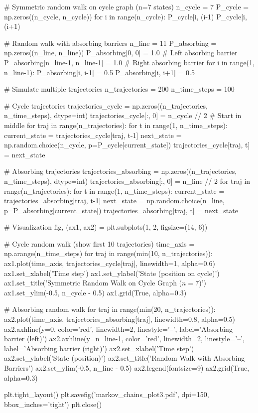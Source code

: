 \documentclass[11pt,a4paper]{article}
\begin{document}
\begin{pycode}
# Symmetric random walk on cycle graph (n=7 states)
n_cycle = 7
P_cycle = np.zeros((n_cycle, n_cycle))
for i in range(n_cycle):
    P_cycle[i, (i-1) %
    P_cycle[i, (i+1) %

# Random walk with absorbing barriers
n_line = 11
P_absorbing = np.zeros((n_line, n_line))
P_absorbing[0, 0] = 1.0  # Left absorbing barrier
P_absorbing[n_line-1, n_line-1] = 1.0  # Right absorbing barrier
for i in range(1, n_line-1):
    P_absorbing[i, i-1] = 0.5
    P_absorbing[i, i+1] = 0.5

# Simulate multiple trajectories
n_trajectories = 200
n_time_steps = 100

# Cycle trajectories
trajectories_cycle = np.zeros((n_trajectories, n_time_steps), dtype=int)
trajectories_cycle[:, 0] = n_cycle // 2  # Start in middle
for traj in range(n_trajectories):
    for t in range(1, n_time_steps):
        current_state = trajectories_cycle[traj, t-1]
        next_state = np.random.choice(n_cycle, p=P_cycle[current_state])
        trajectories_cycle[traj, t] = next_state

# Absorbing trajectories
trajectories_absorbing = np.zeros((n_trajectories, n_time_steps), dtype=int)
trajectories_absorbing[:, 0] = n_line // 2
for traj in range(n_trajectories):
    for t in range(1, n_time_steps):
        current_state = trajectories_absorbing[traj, t-1]
        next_state = np.random.choice(n_line, p=P_absorbing[current_state])
        trajectories_absorbing[traj, t] = next_state

# Visualization
fig, (ax1, ax2) = plt.subplots(1, 2, figsize=(14, 6))

# Cycle random walk (show first 10 trajectories)
time_axis = np.arange(n_time_steps)
for traj in range(min(10, n_trajectories)):
    ax1.plot(time_axis, trajectories_cycle[traj], linewidth=1, alpha=0.6)
ax1.set_xlabel('Time step')
ax1.set_ylabel('State (position on cycle)')
ax1.set_title('Symmetric Random Walk on Cycle Graph ($n=7$)')
ax1.set_ylim(-0.5, n_cycle - 0.5)
ax1.grid(True, alpha=0.3)

# Absorbing random walk
for traj in range(min(20, n_trajectories)):
    ax2.plot(time_axis, trajectories_absorbing[traj], linewidth=0.8, alpha=0.5)
ax2.axhline(y=0, color='red', linewidth=2, linestyle='--', label='Absorbing barrier (left)')
ax2.axhline(y=n_line-1, color='red', linewidth=2, linestyle='--', label='Absorbing barrier (right)')
ax2.set_xlabel('Time step')
ax2.set_ylabel('State (position)')
ax2.set_title('Random Walk with Absorbing Barriers')
ax2.set_ylim(-0.5, n_line - 0.5)
ax2.legend(fontsize=9)
ax2.grid(True, alpha=0.3)

plt.tight_layout()
plt.savefig('markov_chains_plot3.pdf', dpi=150, bbox_inches='tight')
plt.close()
\end{pycode}
\end{document}
